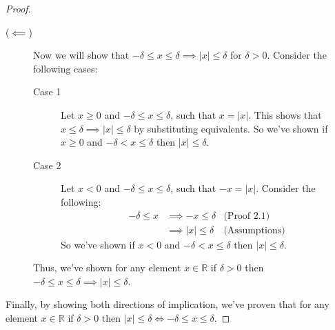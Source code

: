 \documentclass[12pt, letterpaper]{article}
\theoremstyle{plain}
\theoremstyle{definition}
\theoremstyle{remark}
\begin{document}
\begin{itemize}
\begin{proof}
\begin{description}
    \item[($\impliedby$)] Now we will show that $-\delta \le x\le \delta \implies |x|\le \delta$ for $\delta >0$. Consider the following cases:
    \begin{description}
        \item[Case 1] Let $x\ge 0$ and $-\delta \le x\le \delta$, such that $x=|x|$. This shows that $x\le \delta\implies |x|\le \delta$ by substituting equivalents. So we've shown if $x\ge 0$ and $-\delta <x\le \delta$ then $|x|\le \delta$.
        
        \item[Case 2] Let $x<0$ and $-\delta \le x\le \delta$, such that $-x=|x|$. Consider the following:
        \begin{align*}
            -\delta\le x &\implies -x\le \delta  &\text{(Proof 2.1)} \\
                         &\implies |x|\le \delta &\text{(Assumptions)}
        \end{align*}
        So we've shown if $x< 0$ and $-\delta <x\le \delta$ then $|x|\le \delta$.
    \end{description}
    Thus, we've shown for any element $x\in\mathbb{R}$ if $\delta >0$ then $-\delta \le x\le \delta\implies |x|\le \delta$.
\end{description}
Finally, by showing both directions of implication, we've proven that for any element $x\in\mathbb{R}$ if $\delta >0$ then $|x|\le \delta \iff -\delta \le x\le \delta$.
\end{proof}

\end{itemize}
\end{document}
